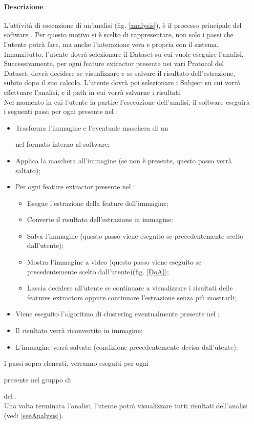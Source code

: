 \paragraph{Descrizione\\}
L'attività di esecuzione di un'analisi (fig. \ref{analysis}), è il processo principale del software \project{}. Per questo motivo si è scelto di rappresentare, non solo i passi che l'utente potrà fare, ma anche l'interazione vera e propria con il sistema.\\
Innanzitutto, l'utente dovrà selezionare il Dataset\glossario{} su cui vuole eseguire l'analisi. Successivamente, per ogni feature extractor\glossario{} presente nei vari Protocol\glossario{} del Dataset\glossario{}, dovrà decidere se visualizzare e se salvare il risultato dell'estrazione, subito dopo il suo calcolo. L'utente dovrà poi selezionare i Subject\glossario{} su cui vorrà effettuare l'analisi, e il path in cui vorrà salvarne i risultati.\\ Nel momento in cui l'utente fa partire l'esecuzione dell'analisi, il software eseguirà i seguenti passi per ogni \protocol{} presente nel \dataset{}:
\begin{itemize}
\item Trasforma l'immagine e l'eventuale maschera di un \subject{} nel formato interno al software;
\item Applica la maschera all'immagine (se non è presente, questo passo verrà saltato);
\item Per ogni feature extractor\glossario{} presente nel \protocol{}:
\begin{itemize}
\item Esegue l'estrazione della feature\glossario{} dell'immagine;
\item Converte il risultato dell'estrazione in immagine;
\item Salva l'immagine (questo passo viene eseguito se precedentemente scelto dall'utente);
\item Mostra l'immagine a video (questo passo viene eseguito se precedentemente scelto dall'utente)(fig. \ref{DoA});
\item Lascia decidere all'utente se continuare a visualizzare i risultati delle features extractors\glossario{} oppure continuare l'estrazione senza più mostrarli;
\end{itemize}
\item Viene eseguito l'algoritmo di clustering\glossario{} eventualmente presente nel \protocol{};
\item Il risultato verrà riconvertito in immagine;
\item L'immagine verrà salvata (condizione precedentemente decisa dall'utente);
\end{itemize}
I passi sopra elencati, verranno eseguiti per ogni \subject{} presente nel gruppo di \subject{} del \dataset{}.\\
Una volta terminata l'analisi, l'utente potrà visualizzare tutti risultati dell'analisi (vedi \ref{seeAnalysis}).
\\


